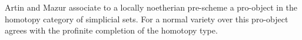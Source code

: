 Artin and Mazur associate to a locally noetherian pre-scheme a pro-object in the homotopy category of simplicial sets. For a normal variety over  this pro-object agrees with the profinite completion of the homotopy type.